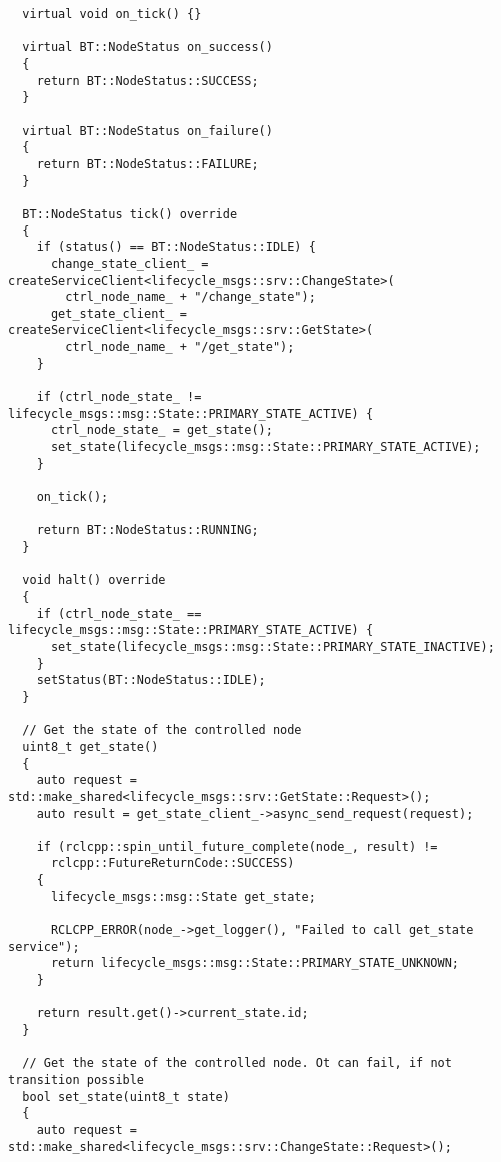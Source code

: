 \begin{tcolorbox}[sharp corners, colframe=gray!80, colback=LightGray, left=0pt, top=0pt, bottom=0pt, title=\texttt{br2\_bt\_patrolling/include/br2\_bt\_patrolling/ctrl\_support/BTLifecycleCtrlNode.hpp}]
\begin{verbatim}
  virtual void on_tick() {}

  virtual BT::NodeStatus on_success()
  {
    return BT::NodeStatus::SUCCESS;
  }

  virtual BT::NodeStatus on_failure()
  {
    return BT::NodeStatus::FAILURE;
  }

  BT::NodeStatus tick() override
  {
    if (status() == BT::NodeStatus::IDLE) {
      change_state_client_ = createServiceClient<lifecycle_msgs::srv::ChangeState>(
        ctrl_node_name_ + "/change_state");
      get_state_client_ = createServiceClient<lifecycle_msgs::srv::GetState>(
        ctrl_node_name_ + "/get_state");
    }

    if (ctrl_node_state_ != lifecycle_msgs::msg::State::PRIMARY_STATE_ACTIVE) {
      ctrl_node_state_ = get_state();
      set_state(lifecycle_msgs::msg::State::PRIMARY_STATE_ACTIVE);
    }

    on_tick();

    return BT::NodeStatus::RUNNING;
  }

  void halt() override
  {
    if (ctrl_node_state_ == lifecycle_msgs::msg::State::PRIMARY_STATE_ACTIVE) {
      set_state(lifecycle_msgs::msg::State::PRIMARY_STATE_INACTIVE);
    }
    setStatus(BT::NodeStatus::IDLE);
  }

  // Get the state of the controlled node
  uint8_t get_state()
  {
    auto request = std::make_shared<lifecycle_msgs::srv::GetState::Request>();
    auto result = get_state_client_->async_send_request(request);

    if (rclcpp::spin_until_future_complete(node_, result) !=
      rclcpp::FutureReturnCode::SUCCESS)
    {
      lifecycle_msgs::msg::State get_state;

      RCLCPP_ERROR(node_->get_logger(), "Failed to call get_state service");
      return lifecycle_msgs::msg::State::PRIMARY_STATE_UNKNOWN;
    }

    return result.get()->current_state.id;
  }

  // Get the state of the controlled node. Ot can fail, if not transition possible
  bool set_state(uint8_t state)
  {
    auto request = std::make_shared<lifecycle_msgs::srv::ChangeState::Request>();


\end{verbatim}
\end{tcolorbox}
